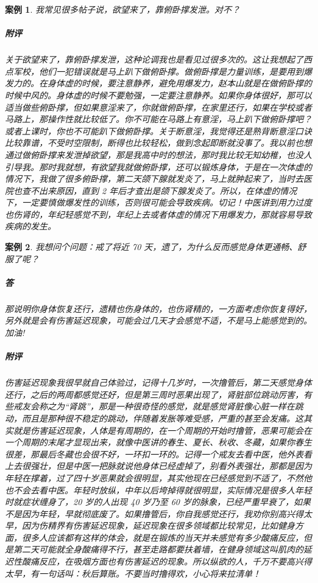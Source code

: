 \documentclass{ctexart}
\newtheorem{case}{案例}
\begin{document}
\begin{case}
    我常见很多帖子说，欲望来了，靠俯卧撑发泄。对不？
    \subparagraph{附评} 关于欲望来了，靠俯卧撑发泄，这种论调我也是看见过很多次的。这让我想起了西点军校，他们一犯错误就是马上趴下做俯卧撑。做俯卧撑是力量训练，是要用到爆发力的。在身体虚的时候，要注意静养，避免用爆发力，赵本山就是在做俯卧撑的时候中风的。身体虚的时候不要勉强，一定要注意静养。如果你身体很好，那可以适当做些俯卧撑，但如果意淫来了，你就做俯卧撑，在家里还行，如果在学校或者马路上，那操作性就比较低了。你不可能在马路上有意淫，马上趴下做俯卧撑吧？或者上课时，你也不可能趴下做俯卧撑。关于断意淫，我觉得还是熟背断意淫口诀比较靠谱，不受时空限制，断得也比较轻松，做到念起即断就没事了。我以前也想通过做俯卧撑来发泄掉欲望，那是我高中时的想法，那时我比较无知幼稚，也没人引导我。那时我就想，有欲望我就做俯卧撑，还可以锻炼身体，于是在一次体虚的情况下，我做了很多俯卧撑，第二天颌下腺就发炎了，马上就肿起来了，当时去医院也查不出来原因，直到 2 年后才查出是颌下腺发炎了。所以，在体虚的情况下，一定要慎做爆发性的训练，否则很可能会导致疾病。切记！中医讲到用力过度也伤肾的，年纪轻感觉不到，年纪上去或者体虚的情况下用爆发力，那就容易导致疾病的发生。
\end{case}

\begin{case}
    我想问个问题：戒了将近 70 天，遗了，为什么反而感觉身体更通畅、舒服了呢？
    \subparagraph{答} 那说明你身体恢复还行，遗精也伤身体的，也伤肾精的，一方面考虑你恢复得好，另外就是会有伤害延迟现象，可能会过几天才会感觉不适，不是马上能感觉到的。加油!
    \subparagraph{附评} 伤害延迟现象我很早就自己体验过，记得十几岁时，一次撸管后，第二天感觉身体还行，之后的两周都感觉还好，但是第三周时恶果出现了，肾脏部位跳动厉害，有些戒友会称之为“肾跳”，那是一种很奇怪的感觉，就是感觉肾脏像心脏一样在跳动，而且是那种很不稳定的跳动，伴随着发胀等难受感，严重的甚至会发痛。这其实就是伤害延迟现象，人体是有周期的，在一个周期的开始时撸管，恶果可能会在一个周期的末尾才显现出来，就像中医讲的春生、夏长、秋收、冬藏，如果你春生很差，那最后冬藏也会很不好，一环扣一环的。记得一个戒友去看中医，他外表看上去很强壮，但是中医一把脉就说他身体已经虚掉了，别看外表强壮，那都是因为年轻在撑着，过了四十岁恶果就会很明显，其实他现在已经感觉到不适了，不然他也不会去看中医。年轻时放纵，中年以后垮掉得就很明显，实际情况是很多人年轻时就症状缠身了，20 岁的人出现 40 岁乃至 60 岁的脉象，已经严重早衰了，如果不是因为年轻，早就彻底废了。如果撸管后，你自我感觉还行，我劝你别高兴得太早，因为伤精界有伤害延迟现象，延迟现象在很多领域都比较常见，比如健身方面，很多人应该都有这样的体会，就是在锻炼的当天并未感觉有多少酸痛反应，但是第二天可能就全身酸痛得不行，甚至走路都要扶着墙，在健身领域这叫肌肉的延迟性酸痛反应，在吸烟方面也有伤害延迟的现象。所以纵欲的人，千万不要高兴得太早，有一句话叫：秋后算账。不要当时撸得欢，小心将来拉清单！
\end{case}
\end{document}
